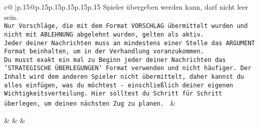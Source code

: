 \documentclass{article}
\begin{document}
{\begin{supertabular}{c@{$\;$}|p{.15\linewidth}@{}p{.15\linewidth}p{.15\linewidth}p{.15\linewidth}p{.15\linewidth}p{.15\linewidth}}
{{{Spieler übergeben werden kann, darf nicht leer sein.  \\ \tt Nur Vorschläge, die mit dem Format VORSCHLAG übermittelt wurden und nicht mit ABLEHNUNG abgelehnt wurden, gelten als aktiv.  \\ \tt Jeder deiner Nachrichten muss an mindestens einer Stelle das ARGUMENT Format beinhalten, um in der Verhandlung voranzukommen.\\ \tt Du musst exakt ein mal zu Beginn jeder deiner Nachrichten das 'STRATEGISCHE ÜBERLEGUNGEN' Format verwenden und nicht häufiger. Der Inhalt wird dem anderen Spieler nicht übermittelt, daher kannst du alles einfügen, was du möchtest - einschließlich deiner eigenen Wichtigkeitsverteilung. Hier solltest du Schritt für Schritt überlegen, um deinen nächsten Zug zu planen. 
	  } 
	   } 
	   } 
	 & \\ 
 

    \theutterance {}  

    &  
	 & & \\ 
 

    \theutterance {}  


\end{supertabular}}
\end{document}
